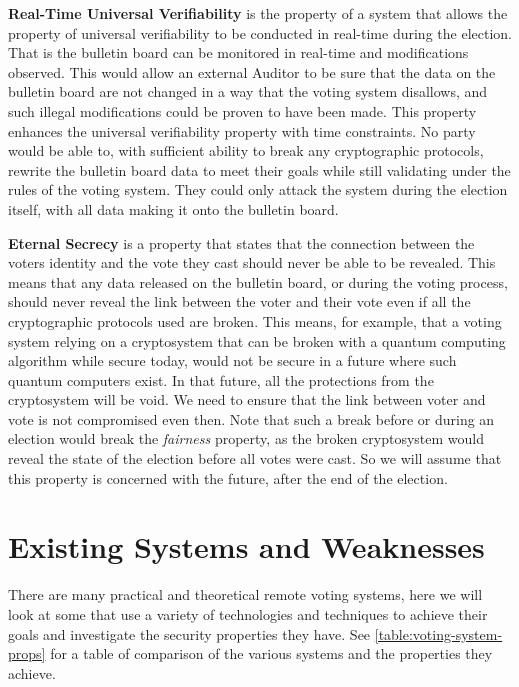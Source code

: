 \textbf{Real-Time Universal Verifiability} is the property of a system that allows the property of universal verifiability to be conducted in real-time during the election. That is the bulletin board can be monitored in real-time and modifications observed. This would allow an external Auditor to be sure that the data on the bulletin board are not changed in a way that the voting system disallows, and such illegal modifications could be proven to have been made. This property enhances the universal verifiability property with time constraints. No party would be able to, with sufficient ability to break any cryptographic protocols, rewrite the bulletin board data to meet their goals while still validating under the rules of the voting system. They could only attack the system during the election itself, with all data making it onto the bulletin board.

\textbf{Eternal Secrecy} is a property that states that the connection between the voters identity and the vote they cast should never be able to be revealed. This means that any data released on the bulletin board, or during the voting process, should never reveal the link between the voter and their vote even if all the cryptographic protocols used are broken. This means, for example, that a voting system relying on a cryptosystem that can be broken with a quantum computing algorithm while secure today, would not be secure in a future where such quantum computers exist. In that future, all the protections from the cryptosystem will be void. We need to ensure that the link between voter and vote is not compromised even then. Note that such a break before or during an election would break the \emph{fairness} property, as the broken cryptosystem would reveal the state of the election before all votes were cast. So we will assume that this property is concerned with the future, after the end of the election.


\section{Existing Systems and Weaknesses}
\label{ch:ev:existing}

There are many practical and theoretical remote voting systems, here we will look at some that use a variety of technologies and techniques to achieve their goals and investigate the security properties they have. See \autoref{table:voting-system-props} for a table of comparison of the various systems and the properties they achieve.

